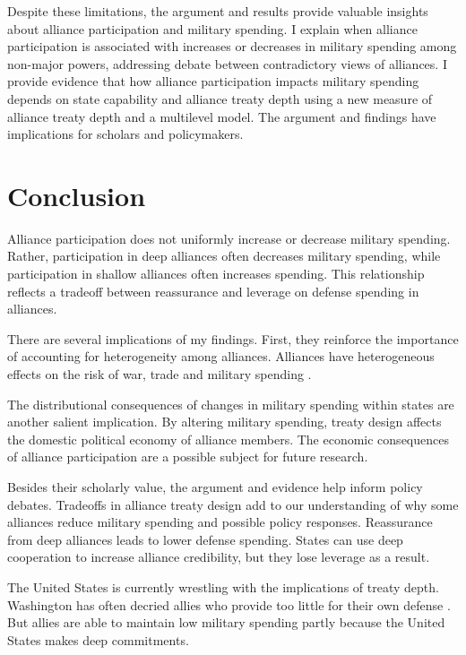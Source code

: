 \documentclass[12pt]{article}
\begin{document}
Despite these limitations, the argument and results provide valuable insights about alliance participation and military spending. 
I explain when alliance participation is associated with increases or decreases in military spending among non-major powers, addressing debate between contradictory views of alliances.  
I provide evidence that how alliance participation impacts military spending depends on state capability and alliance treaty depth using a new measure of alliance treaty depth and a multilevel model. 
The argument and findings have implications for scholars and policymakers. 


\section{Conclusion}

Alliance participation does not uniformly increase or decrease military spending. 
Rather, participation in deep alliances often decreases military spending, while participation in shallow alliances often increases spending. 
This relationship reflects a tradeoff between reassurance and leverage on defense spending in alliances. 


There are several implications of my findings.  
First, they reinforce the importance of accounting for heterogeneity among alliances.
Alliances have heterogeneous effects on the risk of war, trade and military spending \citep{Leeds2003, LongLeeds2006, Benson2012, DigiuseppePoast2016}. 


The distributional consequences of changes in military spending within states are another salient implication.  
By altering military spending, treaty design affects the domestic political economy of alliance members. 
The economic consequences of alliance participation are a possible subject for future research. 


Besides their scholarly value, the argument and evidence help inform policy debates. 
Tradeoffs in alliance treaty design add to our understanding of why some alliances reduce military spending and possible policy responses. 
Reassurance from deep alliances leads to lower defense spending. 
States can use deep cooperation to increase alliance credibility, but they lose leverage as a result. 


The United States is currently wrestling with the implications of treaty depth. 
Washington has often decried allies who provide too little for their own defense \citep{Lanoszka2015}. 
But allies are able to maintain low military spending partly because the United States makes deep commitments. 
\end{document}
